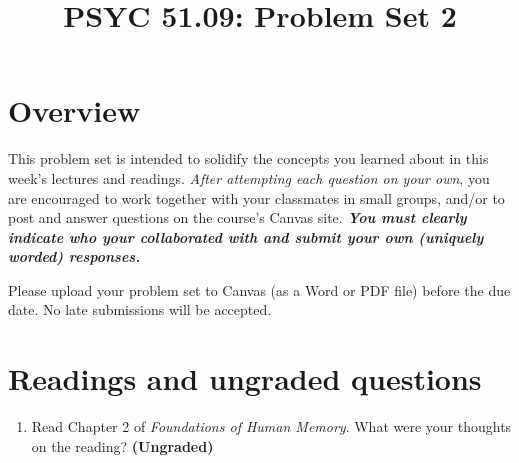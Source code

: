 \documentclass[11pt]{article}
\title{PSYC 51.09: Problem Set 2}
\date{}
\begin{document}
\maketitle
\vspace{-0.75in}
\section*{Overview}
This problem set is intended to solidify the concepts you learned
about in this week's lectures and readings.  \textit{After
  attempting each question on your own}, you are encouraged to work
together with your classmates in small groups, and/or to post and
answer questions on the course’s Canvas site.  \textbf{\textit{You
    must clearly indicate who your collaborated with and submit your
    own (uniquely worded) responses.}}

Please upload your problem set to Canvas (as a Word or PDF file)
before the due date.  No late submissions will be accepted.

\section*{Readings and ungraded questions}
\begin{enumerate}
\item Read Chapter 2 of \textit{Foundations of Human Memory}.  What were your thoughts on the reading?
  \textbf{(Ungraded)}
\end{enumerate}
\end{document}
